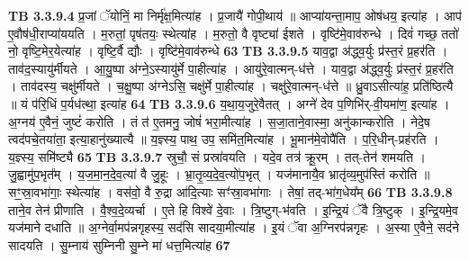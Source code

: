 \documentclass[17pt]{extarticle}
\begin{document}
{{{{{{{{{{{{{{{{{{{                  \newline
                                \textbf{ TB 3.3.9.4} \newline
                  प्र॒जां ॅयोनिं॒ मा निर्मृ॑क्ष॒मित्या॑ह । प्र॒जायै॑ गोपी॒थाय॑ ॥ आप्या॑यन्ता॒माप॒ ओष॑धय॒ इत्या॑ह । आप॑ ए॒वौष॑धी॒राप्या॑ययति । म॒रुतां॒ पृष॑तयः॒ स्थेत्या॑ह । म॒रुतो॒ वै वृष्ट्या॑ ईशते । वृष्टि॑मे॒वाव॑रुन्धे । दिवं॑ गच्छ॒ ततो॑ नो॒ वृष्टि॒मेर॒येत्या॑ह । वृष्टि॒र्वै द्यौः । वृष्टि॑मे॒वाव॑रुन्धे \textbf{ 63} \newline
                  \newline
                                \textbf{ TB 3.3.9.5} \newline
                  याव॒द्वा अ॑द्ध्व॒र्युः प्र॑स्त॒रं प्र॒हर॑ति । ताव॑द॒स्यायु॑र्मीयते । आ॒यु॒ष्पा अ॑ग्ने॒ऽस्यायु॑र्मे पा॒हीत्या॑ह । आयु॑रे॒वात्मन्-ध॑त्ते । याव॒द्वा अ॑द्ध्व॒र्युः प्र॑स्त॒रं प्र॒हर॑ति । ताव॑दस्य॒ चक्षु॑र्मीयते । च॒क्षु॒ष्पा अ॑ग्नेऽसि॒ चक्षु॑र्मे पा॒हीत्या॑ह । चक्षु॑रे॒वात्मन्-ध॑त्ते ॥ ध्रु॒वाऽसीत्या॑ह॒ प्रति॑ष्ठित्यै ॥ यं प॑रि॒धिं प॒र्यध॑त्था॒ इत्या॑ह \textbf{ 64} \newline
                  \newline
                                \textbf{ TB 3.3.9.6} \newline
                  य॒था॒य॒जुरे॒वैतत् । अग्ने॑ देव प॒णिभि॑र्-वी॒यमा॑ण॒ इत्या॑ह । अ॒ग्नय॑ ए॒वैनं॒ जुष्टं॑ करोति । तं त॑ ए॒तमनु॒ जोषं॑ भरा॒मीत्या॑ह । स॒जा॒ताने॒वास्मा॒ अनु॑कान्करोति । नेदे॒ष त्वद॑पचे॒तया॑ता॒ इत्या॒हानु॑ख्यात्यै ॥ य॒ज्ञ्स्य॒ पाथ॒ उप॒ समि॑त॒मित्या॑ह । भू॒मान॑मे॒वोपै॑ति । प॒रि॒धीन्-प्रह॑रति । य॒ज्ञ्स्य॒ समि॑ष्ट्यै \textbf{ 65} \newline
                  \newline
                                \textbf{ TB 3.3.9.7} \newline
                  स्रुचौ॒ सं प्रस्रा॑वयति । यदे॒व तत्र॑ क्रू॒रम् । तत्-तेन॑ शमयति । जु॒ह्वामु॑प॒भृत᳚म् । य॒ज॒मा॒न॒दे॒व॒त्या॑ वै जु॒हूः । भ्रा॒तृ॒व्य॒दे॒व॒त्यो॑प॒भृत् । यज॑मानायै॒व भ्रातृ॑व्य॒मुप॑स्तिं करोति ॥ सꣳ॒॒स्रा॒वभा॑गाः॒ स्थेत्या॑ह । वस॑वो॒ वै रु॒द्रा आ॑दि॒त्याः सꣳ॑स्रा॒वभा॑गाः । तेषां॒ तद्-भा॑ग॒धेय᳚म् \textbf{ 66} \newline
                  \newline
                                \textbf{ TB 3.3.9.8} \newline
                  ताने॒व तेन॑ प्रीणाति । वै॒श्व॒दे॒व्यर्चा । ए॒ते हि विश्वे॑ दे॒वाः । त्रि॒ष्टुग्-भ॑वति । इ॒न्द्रि॒यं ॅवै त्रि॒ष्टुक् । इ॒न्द्रि॒यमे॒व यज॑माने दधाति ॥ अ॒ग्नेर्वा॒मप॑न्नगृहस्य॒ सद॑सि सादया॒मीत्या॑ह । इ॒यं ॅवा अ॒ग्निरप॑न्नगृहः । अ॒स्या ए॒वैने॒ सद॑ने सादयति । सु॒म्नाय॑ सुम्निनी सु॒म्ने मा॑ धत्त॒मित्या॑ह \textbf{ 67} \newline
}}}}}}}}}}}}}}}}}}}
\end{document}
